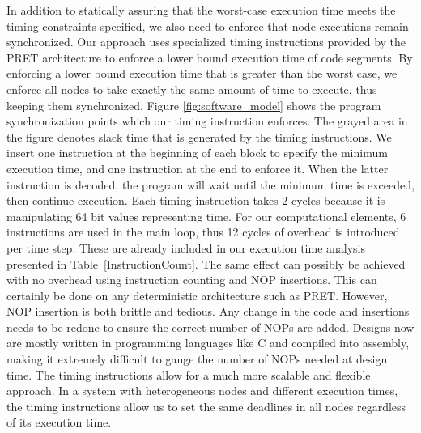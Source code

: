 In addition to statically assuring that the worst-case execution time meets the timing constraints specified, we also need to enforce that node executions remain synchronized.
Our approach uses specialized timing instructions provided by the PRET architecture to enforce a lower bound execution time of code segments.
By enforcing a lower bound execution time that is greater than the worst case, we enforce all nodes to take exactly the same amount of time to execute, thus keeping them synchronized.
Figure \ref{fig:software_model} shows the program synchronization points which our timing instruction enforces.
The grayed area in the figure denotes slack time that is generated by the timing instructions.
We insert one instruction at the beginning of each block to specify the minimum execution time, and one instruction at the end to enforce it.
When the latter instruction is decoded, the program will wait until the minimum time is exceeded, then continue execution.
Each timing instruction takes 2 cycles because it is manipulating 64 bit values representing time. 
For our computational elements, 6 instructions are used in the main loop, thus 12 cycles of overhead is introduced per time step.
These are already included in our execution time analysis presented in Table~\ref{InstructionCount}. 
The same effect can possibly be achieved with no overhead using instruction counting and NOP insertions.
This can certainly be done on any deterministic architecture such as PRET. 
However, NOP insertion is both brittle and tedious. 
Any change in the code and insertions needs to be redone to ensure the correct number of NOPs are added.
Designs now are mostly written in programming languages like C and compiled into assembly, making it extremely difficult to gauge the number of NOPs needed at design time.
The timing instructions allow for a much more scalable and flexible approach. 
In a system with heterogeneous nodes and different execution times, the timing instructions allow us to set the same deadlines in all nodes regardless of its execution time.   


